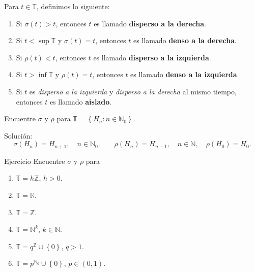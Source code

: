 \begin{frame}
\begin{definition}
Para $t\in\mathds{T}$, definimos lo siguiente:
	\begin{enumerate}
		\item Si $\sigma\left(t\right)>t$, entonces $t$ es llamado \textbf{disperso a la derecha}.
		\item Si $t<\sup\mathds{T}$ y $\sigma\left(t\right)=t$, entonces $t$ es llamado \textbf{denso a la derecha}.
		\item Si $\rho\left(t\right)<t$, entonces $t$ es llamado \textbf{disperso a la izquierda}.
		\item Si $t>\inf\mathds{T}$ y $\rho\left(t\right)=t$, entonces $t$ es llamado \textbf{denso a la izquierda}.
		\item Si $t$ es \emph{disperso a la izquierda} y \emph{disperso a la derecha} al mismo tiempo, entonces $t$ es llamado \textbf{aislado}.
	\end{enumerate}
\end{definition}

\begin{example}
Encuentre $\sigma$ y $\rho$ para $\mathds{T}=\left\{H_{n}:n\in\mathds{N}_{0}\right\}$.

\alert{Solución}: \[ \sigma\left(H_{n}\right)=H_{n+1},\quad n\in\mathds{N}_{0}.\qquad\rho\left(H_{n}\right)=H_{n-1},\quad n\in\mathds{N},\quad\rho\left(H_{0}\right)=H_{0}. \]
\end{example}

\begin{alertblock}{Ejercicio}
Encuentre $\sigma$ y $\rho$ para
	\begin{multicols}{3}
		\begin{enumerate}
			\item $\mathds{T}=h\mathds{Z}$, $h>0$.
			\item $\mathds{T}=\mathds{R}$.
			\item $\mathds{T}=\mathds{Z}$.
			\item $\mathds{T}=\mathds{N}^{k}$, $k\in\mathds{N}$.
			\item $\mathds{T}=q^{\mathds{Z}}\cup\left\{0\right\}$, $q>1$.
			\item $\mathds{T}=p^{\mathds{N}_{0}}\cup\left\{0\right\}$, $p\in\left(0,1\right)$.	
		\end{enumerate}
	\end{multicols}
\end{alertblock}
\end{frame}

